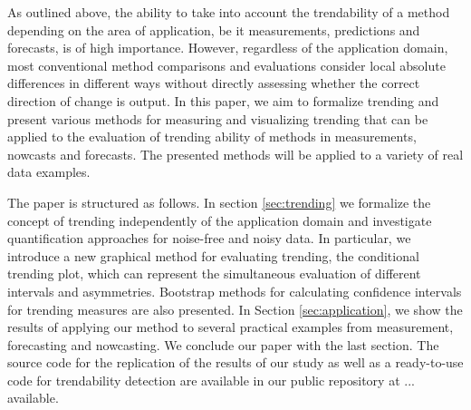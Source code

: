 As outlined above, the ability to take into account the trendability of a method depending on the area of application, be it measurements, predictions and forecasts, is of high importance. However, regardless of the application domain, most conventional method comparisons and evaluations consider local absolute differences in different ways without directly assessing whether the correct direction of change is output. In this paper, we aim to formalize trending and present various methods for measuring and visualizing trending that can be applied to the evaluation of trending ability of methods in measurements, nowcasts and forecasts. The presented methods will be applied to a variety of real data examples. 

The paper is structured as follows. In section \ref{sec:trending} we formalize the concept of trending independently of the application domain and investigate quantification approaches for noise-free and noisy data. In particular, we introduce a new graphical method for evaluating trending, the conditional trending plot, which can represent the simultaneous evaluation of different intervals and asymmetries. Bootstrap methods for calculating confidence intervals for trending measures are also presented. In Section \ref{sec:application}, we show the results of applying our method to several practical examples from measurement, forecasting and nowcasting. We conclude our paper with the last section. The source code for the replication of the results of our study as well as a ready-to-use code for trendability detection are available in our public repository at ... available.